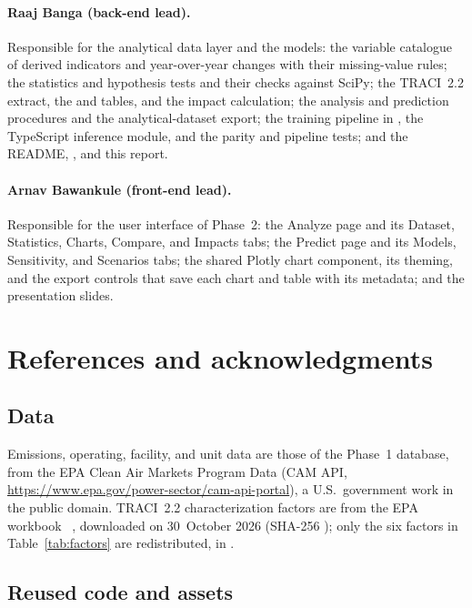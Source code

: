 \documentclass[11pt,a4paper]{article}
\begin{document}
\paragraph{Raaj Banga (back-end lead).} Responsible for the analytical data layer and the models:
the variable catalogue of derived indicators and year-over-year changes with their
missing-value rules; the statistics and hypothesis tests and their checks against SciPy; the
TRACI~2.2 extract, the  and  tables, and the impact
calculation; the analysis and prediction procedures and the analytical-dataset export; the
training pipeline in , the TypeScript inference module, and the parity and
pipeline tests; and the README, , and this report.

\paragraph{Arnav Bawankule (front-end lead).} Responsible for the user interface of Phase~2: the
Analyze page and its Dataset, Statistics, Charts, Compare, and Impacts tabs; the Predict page and
its Models, Sensitivity, and Scenarios tabs; the shared Plotly chart component, its theming,
and the export controls that save each chart and table with its metadata; and the presentation
slides.

\section{References and acknowledgments}
\label{sec:references}

\subsection{Data}

Emissions, operating, facility, and unit data are those of the Phase~1 database, from the EPA
Clean Air Markets Program Data (CAM API, \url{https://www.epa.gov/power-sector/cam-api-portal}),
a U.S.\ government work in the public domain. TRACI~2.2 characterization factors are from the
EPA workbook ~\cite{epa2022traci22}, downloaded on 30~October 2026
(SHA-256 ); only the six factors in Table~\ref{tab:factors} are
redistributed, in .

\subsection{Reused code and assets}
\end{document}
